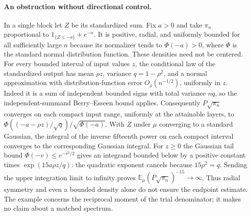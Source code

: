 \paragraph{An obstruction without directional control.}
In a single block let $Z$ be its standardized sum. Fix $a>0$ and take
$\pi_n$ proportional to $1_{\{Z\le-a\}}+e^{-n}$. It is positive, radial,
and uniformly bounded for all sufficiently large $n$ because its normalizer
tends to $\Phi(-a)>0$, where $\Phi$ is the standard normal distribution
function. These densities need not be centered. For every bounded interval
of input values $z$, the conditional law of the standardized output has
mean $\rho z$, variance $q=1-\rho^2$, and a normal approximation with
distribution-function error $O_\rho(n^{-1/2})$, uniformly in $z$.
Indeed it is a sum of independent bounded signs with total variance $nq$,
so the independent-summand Berry--Esseen bound applies. Consequently
$P\sqrt{\pi_n}$ converges on each compact input range, uniformly at the
attainable layers, to
$\Phi((-a-\rho z)/\sqrt q)/\sqrt{\Phi(-a)}$.
With $Z$ under $\mu$ converging to a standard Gaussian, the integral of
the inverse fifteenth power on each compact interval converges to the
corresponding Gaussian integral. For $z\ge0$ the Gaussian tail bound
$\Phi(-v)\le e^{-v^2/2}$ gives an integrand bounded below by a positive
constant times $\exp(15a\rho z/q)$: the quadratic exponent cancels
because $15\rho^2=q$. Sending the upper integration limit to infinity
proves $\mathbb E_\mu(P\sqrt{\pi_n})^{-15}\to\infty$.
Thus radial symmetry and even a bounded density alone do not ensure
the endpoint estimate. The example concerns the reciprocal moment of
the trial denominator; it makes no claim about a matched spectrum.
